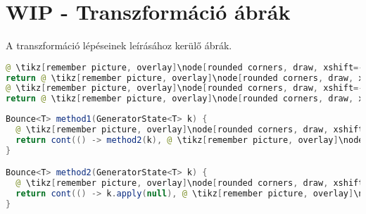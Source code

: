 \chapter*{WIP - Transzformáció ábrák}

A transzformáció lépéseinek leírásához kerülő ábrák.

\begin{center}
\begin{mdframed}
\begin{minipage}[t]{0.4\textwidth}
\begin{lstlisting}[language=Java, numbers=none, breaklines=true]
@ \tikz[remember picture, overlay]\node[rounded corners, draw, xshift=-0.1cm, inner sep=5pt, anchor=west] {Kódrészlet \#1}; \vspace*{0.5cm} @ 
return @ \tikz[remember picture, overlay]\node[rounded corners, draw, xshift=-0.1cm, inner sep=5pt, anchor=west, yshift=0.1cm] {Kifejezés \#1}; \vspace*{0.3cm} @
@ \tikz[remember picture, overlay]\node[rounded corners, draw, xshift=-0.1cm, inner sep=5pt, anchor=west] {Kódrészlet \#2}; \vspace*{0.5cm} @ 
return @ \tikz[remember picture, overlay]\node[rounded corners, draw, xshift=-0.1cm, inner sep=5pt, anchor=west, yshift=0.1cm] {Kifejezés \#2}; \vspace*{0.3cm} @
\end{lstlisting}
\end{minipage} 
\begin{minipage}[t]{0.6\textwidth}
\begin{lstlisting}[language=Java, numbers=none, breaklines=true]
Bounce<T> method1(GeneratorState<T> k) {
  @ \tikz[remember picture, overlay]\node[rounded corners, draw, xshift=-0.1cm, inner sep=5pt, anchor=west] {Kódrészlet \#1}; \vspace*{0.3cm} @
  return cont(() -> method2(k), @ \tikz[remember picture, overlay]\node[rounded corners, draw, xshift=-0.1cm, inner sep=5pt, anchor=west, yshift=0.1cm] {Kifejezés \#1}; \vspace*{0.2cm} \hspace*{1.75cm} @);
}

Bounce<T> method2(GeneratorState<T> k) {
  @ \tikz[remember picture, overlay]\node[rounded corners, draw, xshift=-0.1cm, inner sep=5pt, anchor=west] {Kódrészlet \#2}; \vspace*{0.3cm} @
  return cont(() -> k.apply(null), @ \tikz[remember picture, overlay]\node[rounded corners, draw, xshift=-0.2cm, inner sep=5pt, anchor=west, yshift=0.1cm] {Kifejezés \#2}; \vspace*{0.2cm} \hspace*{1.6cm} @);
}
\end{lstlisting} 
\end{minipage}
\end{mdframed}
\end{center}

